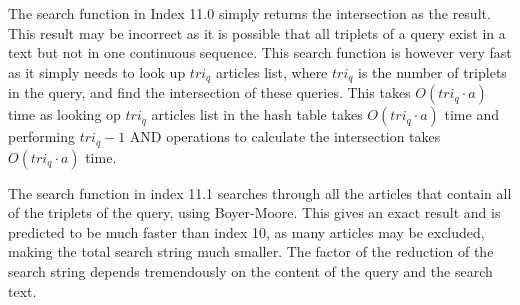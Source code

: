 The search function in Index 11.0 simply returns the intersection as the result. This result may be incorrect as it is possible that all triplets of a query exist in a text but not in one continuous sequence. This search function is however very fast as it simply needs to look up $tri_q$ articles list, where $tri_q$ is the number of triplets in the query, and find the intersection of these queries. This takes $O(tri_q\cdot a)$ time as looking op $tri_q$ articles list in the hash table takes $O(tri_q\cdot a)$ time and performing $tri_q - 1 $ AND operations to calculate the intersection takes $O(tri_q\cdot a)$ time.

The search function in index 11.1 searches through all the articles that contain all of the triplets of the query, using Boyer-Moore. This gives an exact result and is predicted to be much faster than index 10, as many articles may be excluded, making the total search string much smaller. The factor of the reduction of the search string depends tremendously on the content of the query and the search text.